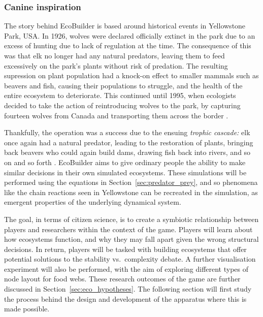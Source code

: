 \subsubsection{Canine inspiration}
\label{sec:yellowstone}
The story behind EcoBuilder is based around historical events in Yellowstone Park, USA. In 1926, wolves were declared officially extinct in the park due to an excess of hunting due to lack of regulation at the time. 
The consequence of this was that elk no longer had any natural predators, leaving them to feed excessively on the park's plants without risk of predation. The resulting supression on plant population had a knock-on effect to smaller mammals such as beavers and fish, causing their populations to struggle, and the health of the entire ecosystem to deteriorate.
This continued until 1995, when ecologists decided to take the action of reintroducing wolves to the park, by capturing fourteen wolves from Canada and transporting them across the border \cite{Smith2003}.

Thankfully, the operation was a success due to the ensuing \emph{trophic cascade:} elk once again had a natural predator, leading to the restoration of plants, bringing back beavers who could again build dams, drawing fish back into rivers, and so on and so forth \cite{Dobson2014}.
EcoBuilder aims to give ordinary people the ability to make similar decisions in their own simulated ecosystems. These simulations will be performed using the equations in Section~\ref{sec:predator_prey}, and so phenomena like the chain reactions seen in Yellowstone can be recreated in the simulation, as emergent properties of the underlying dynamical system.

The goal, in terms of citizen science, is to create a symbiotic relationship between players and researchers within the context of the game.
Players will learn about how ecosystems function, and why they may fall apart given the wrong structural decisions. In return, players will be tasked with building ecosystems that offer potential solutions to the stability vs.\ complexity debate. A further visualisation experiment will also be performed, with the aim of exploring different types of node layout for food webs. These research outcomes of the game are further discussed in Section~\ref{sec:eco_hypotheses}.
The following section will first study the process behind the design and development of the apparatus where this is made possible.


